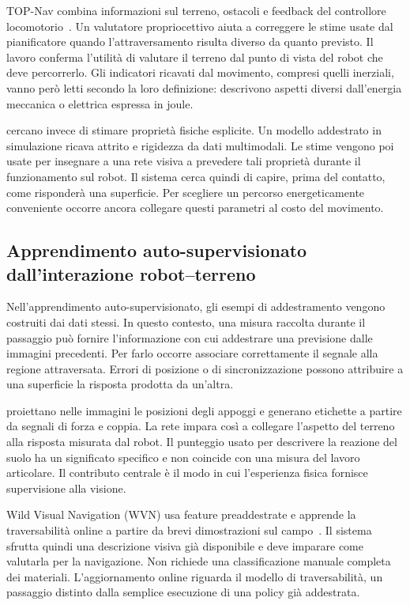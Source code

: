 TOP-Nav combina informazioni sul terreno, ostacoli e feedback del controllore locomotorio~\citep{Ren2025TOPNav}. Un valutatore propriocettivo aiuta a correggere le stime usate dal pianificatore quando l'attraversamento risulta diverso da quanto previsto. Il lavoro conferma l'utilità di valutare il terreno dal punto di vista del robot che deve percorrerlo. Gli indicatori ricavati dal movimento, compresi quelli inerziali, vanno però letti secondo la loro definizione: descrivono aspetti diversi dall'energia meccanica o elettrica espressa in joule.

\citet{Chen2024Physical} cercano invece di stimare proprietà fisiche esplicite. Un modello addestrato in simulazione ricava attrito e rigidezza da dati multimodali. Le stime vengono poi usate per insegnare a una rete visiva a prevedere tali proprietà durante il funzionamento sul robot. Il sistema cerca quindi di capire, prima del contatto, come risponderà una superficie. Per scegliere un percorso energeticamente conveniente occorre ancora collegare questi parametri al costo del movimento.

\subsection{Apprendimento auto-supervisionato dall'interazione robot--terreno}

Nell'apprendimento auto-supervisionato, gli esempi di addestramento vengono costruiti dai dati stessi. In questo contesto, una misura raccolta durante il passaggio può fornire l'informazione con cui addestrare una previsione dalle immagini precedenti. Per farlo occorre associare correttamente il segnale alla regione attraversata. Errori di posizione o di sincronizzazione possono attribuire a una superficie la risposta prodotta da un'altra.

\citet{Wellhausen2019Where} proiettano nelle immagini le posizioni degli appoggi e generano etichette a partire da segnali di forza e coppia. La rete impara così a collegare l'aspetto del terreno alla risposta misurata dal robot. Il punteggio usato per descrivere la reazione del suolo ha un significato specifico e non coincide con una misura del lavoro articolare. Il contributo centrale è il modo in cui l'esperienza fisica fornisce supervisione alla visione.

Wild Visual Navigation (WVN) usa feature preaddestrate e apprende la traversabilità online a partire da brevi dimostrazioni sul campo~\citep{Mattamala2025Wild}. Il sistema sfrutta quindi una descrizione visiva già disponibile e deve imparare come valutarla per la navigazione. Non richiede una classificazione manuale completa dei materiali. L'aggiornamento online riguarda il modello di traversabilità, un passaggio distinto dalla semplice esecuzione di una policy già addestrata.

